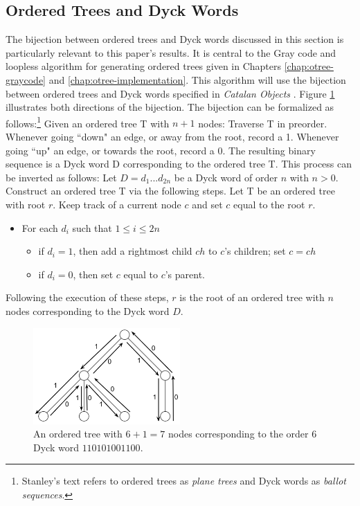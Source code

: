 \subsection{Ordered Trees and Dyck Words} \label{subsec:otree-dyck-bij}
The bijection between ordered trees and Dyck words discussed in this section is particularly relevant to this paper's results. It is central to the Gray code and loopless algorithm for generating ordered trees given in Chapters \ref{chap:otree-graycode} and \ref{chap:otree-implementation}.
This algorithm will use the bijection between ordered trees and Dyck words specified in \emph{Catalan Objects} \cite{stanley2015Catalan}. Figure \ref{ordered_tree_bijection_illustration} illustrates both directions of the bijection.
The bijection can be formalized as follows:\footnote{ Stanley's text refers to ordered trees as \emph{plane trees} and Dyck words as \emph{ballot sequences}.} 
Given an ordered tree T with $n+1$ nodes: Traverse T in preorder.  Whenever going ``down" an edge, or away from the root, record a 1.  Whenever going ``up" an edge, or towards the root, record a 0.  The resulting binary sequence is a Dyck word D corresponding to the ordered tree T. 
This process can be inverted as follows: 
Let $D=d_1...d_{2n}$ be a Dyck word of order $n$ with $n > 0$. Construct an ordered tree T via the following steps.
Let T be an ordered tree with root $r$.  Keep track of a current node $c$ and set $c$ equal to the root $r$.

\begin{itemize}
    \item For each $d_i$ such that $1 \le i \le 2n$ 
	\begin{itemize}
	    \item if $d_i=1$, then add a rightmost child $ch$ to $c$'s children; set $c=ch$
	    \item if $d_i=0$, then set $c$ equal to $c$'s parent.
	\end{itemize}

\end{itemize}

Following the execution of these steps, $r$ is the root of an ordered tree with $n$ nodes corresponding to the Dyck word $D$.

\begin{figure}
    \centering
    \includegraphics[width=0.5\textwidth]{otreebij.png}
    \caption{An ordered tree with $6+1=7$ nodes corresponding to the order 6 Dyck word $110101001100$.}
    \label{ordered_tree_bijection_illustration}
\end{figure}

